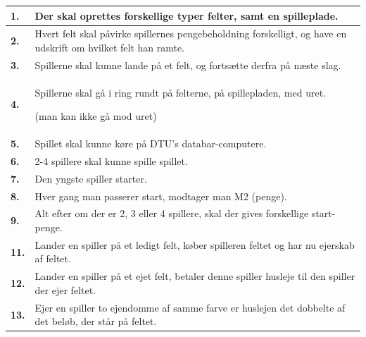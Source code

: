 \begin{tabular}{| l |p{13cm}|}

    \hline
    \textbf{1.} 
    &
    Der skal oprettes forskellige typer felter, samt en spilleplade. 
    \\
    
    \hline
    \textbf{2.} 
    &
    Hvert felt skal påvirke spillernes pengebeholdning forskelligt, og have en udskrift om hvilket felt han ramte. 
    \\
    
    \hline
    \textbf{3.} 
    &
    Spillerne skal kunne lande på et felt, og fortsætte derfra på næste slag. 
    \\
    
    \hline
    \textbf{4.} 
    &
    Spillerne skal gå i ring rundt på felterne, på spillepladen, med uret. 

    (man kan ikke gå mod uret) 
    \\
    
    \hline
    \textbf{5.} 
    &
    Spillet skal kunne køre på DTU’s databar-computere. 
    \\
    
    \hline
    \textbf{6.} 
    &
    2-4 spillere skal kunne spille spillet. 
    \\

    \hline
    \textbf{7.} 
    &
    Den yngste spiller starter. 
    \\
      
    \hline
    \textbf{8.}
    &
    Hver gang man passerer start, modtager man M2 (penge). 
    \\
      
    \hline
    \textbf{9.}
    &
    Alt efter om der er 2, 3 eller 4 spillere, skal der gives forskellige start-penge. 
    \\
      
    \hline
    \textbf{11.}
    &
    Lander en spiller på et ledigt felt, køber spilleren feltet og har nu ejerskab af feltet. 
    \\
      
    \hline
    \textbf{12.}
    &
    Lander en spiller på et ejet felt, betaler denne spiller husleje til den spiller der ejer feltet. 
    \\
      
    \hline
    \textbf{13.}
    &
    Ejer en spiller to ejendomme af samme farve er huslejen det dobbelte af det beløb, der står på feltet. 
    \\
    

\end{tabular}
